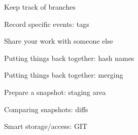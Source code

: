 \documentclass[english]{slides}
\begin{document}
\begin{frame}{Keep track of branches}
\end{frame}


\begin{frame}{Record specific events: tags}
\end{frame}


\begin{frame}{Share your work with someone else}
\end{frame}


\begin{frame}{Putting things back together: hash names}
\end{frame}


\begin{frame}{Putting things back together: merging}
\end{frame}


\begin{frame}{Prepare a snapshot: staging area}
\end{frame}


\begin{frame}{Comparing snapshots: diffs}
\end{frame}


\begin{frame}{Smart storage/access: GIT}



\end{frame}
\end{document}
